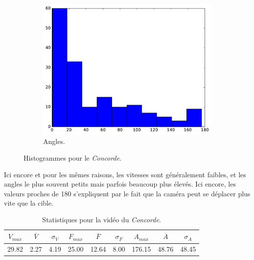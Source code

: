 \begin{figure}[htb]
\begin{subfigure}[t]{\subImgWclicks}
			\centering
			\includegraphics[width=\textwidth]{figures/ch3/concordeA_angle}
			\caption{Angles.}
			\label{fig:concordeA_angle}
		\end{subfigure}
		\caption[Histogrammes pour le \emph{Concorde}]{Histogrammes pour le \emph{Concorde}.}
		\label{fig:histConcorde}
	\end{figure}
	
	Ici encore et pour les mêmes raisons, les vitesses sont généralement faibles, et les angles le plus souvent petits mais parfois beaucoup plus élevés. Ici encore, les valeurs proches de 180\textdegree{} s'expliquent par le fait que la caméra peut se déplacer plus vite que la cible.	
	

\begin{table}
	\centering
	\begin{tabular}{c c c c c c c c c}
		$V_{max}$	& $\overline{V}$	& $\sigma_{V}$	& $F_{max}$	& $\overline{F}$	& $\sigma_{F}$	& $A_{max}$	& $\overline{A}$	& $\sigma_{A}$	\bigstrut[b] \\ \hline

		29.82		& 2.27				& 4.19			& 25.00		& 12.64				& 8.00			& 176.15	& 48.76				& 48.45			\bigstrut[t] \\
	\end{tabular}
	\caption[Statistiques pour la vidéo du \emph{Concorde}]{Statistiques pour la vidéo du \emph{Concorde}.}
	\label{tab:concordeA_stats}
\end{table}

